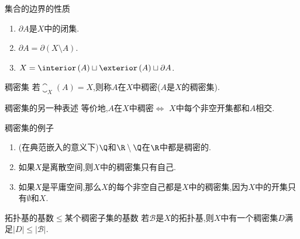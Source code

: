 \begin{proposition}{集合的边界的性质}{}
	\begin{enumerate}
		\item $\partial A$是$X$中的闭集.
		\item $\partial A=\partial\left(X\setminus A\right)$.
		\item $X=\interior\left(A\right)\sqcup\exterior\left(A\right)\sqcup\partial A$.
	\end{enumerate}
\end{proposition}

\begin{definition}{稠密集}{}
	若$\closure_{X}\left(A\right)=X$,则称$A$在$X$中稠密($A$是$X$的稠密集).
\end{definition}

\begin{remark}{稠密集的另一种表述}{}
	等价地,$A$在$X$中稠密$\iff$ $X$中每个非空开集都和$A$相交.
\end{remark}

\begin{example}{稠密集的例子}{}
	\begin{enumerate}
		\item (在典范嵌入的意义下)$\Q$和$\R\setminus\Q$在$\R$中都是稠密的.
		\item 如果$X$是离散空间,则$X$中的稠密集只有自己.
		\item 如果$X$是平庸空间,那么$X$的每个非空自己都是$X$中的稠密集,因为$X$中的开集只有$\emptyset$和$X$.
	\end{enumerate}
\end{example}

\begin{proposition}{拓扑基的基数$\leq$某个稠密子集的基数}{}
	若$\mathcal{B}$是$X$的拓扑基,则$X$中有一个稠密集$D$满足$\left|D\right|\leq\left|\mathcal{B}\right|$.
\end{proposition}